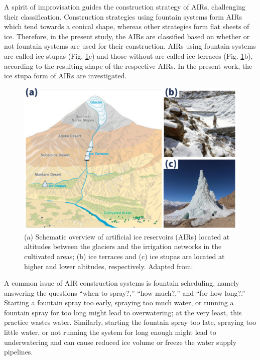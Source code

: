 \documentclass[tc, manuscript]{copernicus}
\begin{document}
A spirit of improvisation guides the construction strategy of AIRs, challenging their classification.
Construction strategies using fountain systems form AIRs which tend towards a conical shape, whereas other
strategies form flat sheets of ice. Therefore, in the present study, the AIRs are classified based on whether or
not fountain systems are used for their construction. AIRs using fountain systems are called ice stupas (Fig.
\ref{fig:AIRforms}c) and those without are called ice terraces (Fig. \ref{fig:AIRforms}b), according to the
resulting shape of the respective AIRs. In the present work, the ice stupa form of AIRs are investigated.

\begin{figure}[htb]
\includegraphics[width=12cm]{Figures/AIR_forms.jpg}

\caption{(a) Schematic overview of artificial ice reservoirs (AIRs) located at
altitudes between the glaciers and the irrigation networks in the cultivated areas; (b) ice terraces and (c) ice
stupas are located at higher and lower altitudes, respectively. Adapted from:
\cite{nusserLocalKnowledgeGlobal2016}}

\label{fig:AIRforms}
\end{figure}

A common issue of AIR construction systems is fountain scheduling, namely answering the questions “when to
spray?,” “how much?,” and “for how long?.” Starting a fountain spray too early, spraying too much water, or
running a fountain spray for too long might lead to overwatering; at the very least, this practice wastes water.
Similarly, starting the fountain spray too late, spraying too little water, or not running the system for long
enough might lead to underwatering and can cause reduced ice volume or freeze the water supply pipelines.
\end{document}
